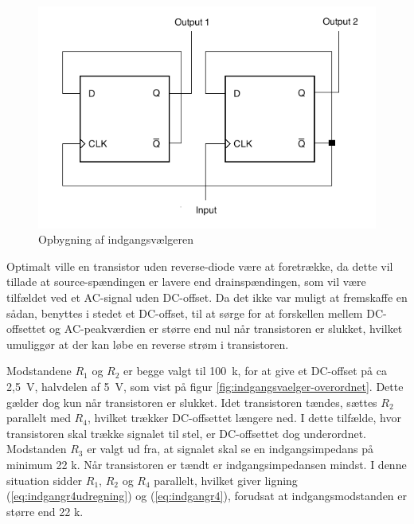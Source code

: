 \begin{figure}[h]
\centering
\includegraphics[scale=0.4]{teknisk/indgangsvaelger/flipflop.png}
\caption{Opbygning af indgangsvælgeren}
\label{fig:indgangsvaelger-flipflop}
\end{figure}

Optimalt ville en transistor uden reverse-diode være at foretrække, da dette vil tillade at source-spændingen er lavere end drainspændingen, som vil være tilfældet ved et AC-signal uden DC-offset. Da det ikke var muligt at fremskaffe en sådan, benyttes i stedet et DC-offset, til at sørge for at forskellen mellem DC-offsettet og AC-peakværdien er større end nul når transistoren er slukket, hvilket umuliggør at der kan løbe en reverse strøm i transistoren.

Modstandene $R_1$ og $R_2$ er begge valgt til 100~k\ohm, for at give et DC-offset på ca 2,5~V, halvdelen af 5~V, som vist på figur \ref{fig:indgangsvaelger-overordnet}. Dette gælder dog kun når transistoren er slukket. Idet transistoren tændes, sættes $R_2$ parallelt med $R_4$, hvilket trækker DC-offsettet længere ned.
I dette tilfælde, hvor transistoren skal trække signalet til stel, er DC-offsettet dog underordnet. 
Modstanden $R_3$ er valgt ud fra, at signalet skal se en indgangsimpedans på minimum 22 k\ohm. Når transistoren er tændt er indgangsimpedansen mindst. I denne situation sidder $R_1$, $R_2$ og $R_4$ parallelt, hvilket giver ligning (\ref{eq:indgangr4udregning}) og (\ref{eq:indgangr4}), forudsat at indgangsmodstanden er større end 22 k\ohm.


